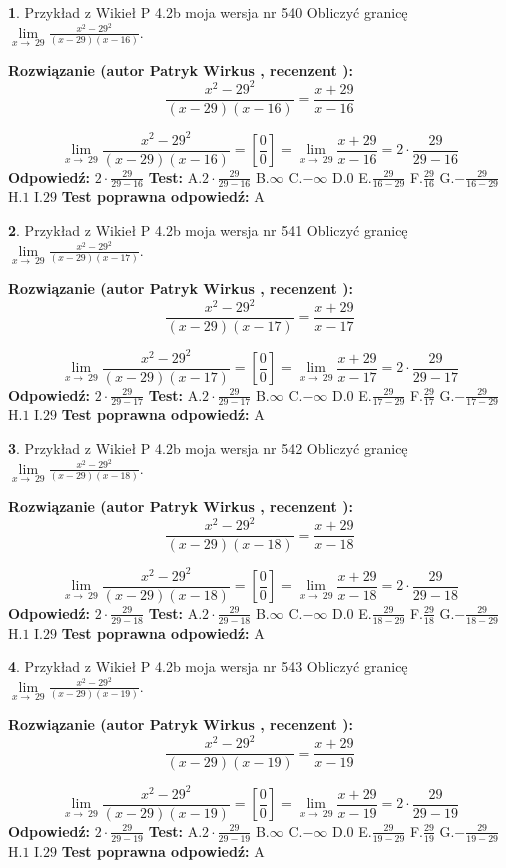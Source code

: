 \documentclass[12pt, a4paper]{article}
\theoremstyle{definition} %
\newtheorem{zad}{}
\newcommand{\zadStart}[1]{\begin{zad}#1\newline}
\newcommand{\zadStop}{\end{zad}}
\newcommand{\rozwStart}[2]{\noindent \textbf{Rozwiązanie (autor #1 , recenzent #2): }\newline}
\newcommand{\rozwStop}{\newline}
\newcommand{\odpStart}{\noindent \textbf{Odpowiedź:}\newline}
\newcommand{\odpStop}{\newline}
\newcommand{\testStart}{\noindent \textbf{Test:}\newline}
\newcommand{\testStop}{\newline}
\newcommand{\kluczStart}{\noindent \textbf{Test poprawna odpowiedź:}\newline}
\newcommand{\kluczStop}{\newline}
\begin{document}
\zadStart{Przykład z Wikieł P 4.2b moja wersja nr 540}
Obliczyć granicę $\lim\limits_{x\to\ 29}\frac{x^{2}-29^{2}}{(x-29)(x-16)}$.
\zadStop
\rozwStart{Patryk Wirkus}{}
$$\frac{x^{2}-29^{2}}{(x-29)(x-16)}=\frac{x+29}{x-16}$$

$$\lim\limits_{x\to\ 29}\frac{x^{2}-29^{2}}{(x-29)(x-16)}=[\frac{0}{0}]=\lim\limits_{x\to\ 29}\frac{x+29}{x-16}=2 \cdot \frac{29}{29-16}$$
\rozwStop
\odpStart
$2 \cdot \frac{29}{29-16}$
\odpStop
\testStart
A.$2 \cdot \frac{29}{29-16}$
B.$\infty$
C.$-\infty$
D.$0$
E.$\frac{29}{16-29}$
F.$\frac{29}{16}$
G.$-\frac{29}{16-29}$
H.$1$
I.$29$
\testStop
\kluczStart
A
\kluczStop



\zadStart{Przykład z Wikieł P 4.2b moja wersja nr 541}
Obliczyć granicę $\lim\limits_{x\to\ 29}\frac{x^{2}-29^{2}}{(x-29)(x-17)}$.
\zadStop
\rozwStart{Patryk Wirkus}{}
$$\frac{x^{2}-29^{2}}{(x-29)(x-17)}=\frac{x+29}{x-17}$$

$$\lim\limits_{x\to\ 29}\frac{x^{2}-29^{2}}{(x-29)(x-17)}=[\frac{0}{0}]=\lim\limits_{x\to\ 29}\frac{x+29}{x-17}=2 \cdot \frac{29}{29-17}$$
\rozwStop
\odpStart
$2 \cdot \frac{29}{29-17}$
\odpStop
\testStart
A.$2 \cdot \frac{29}{29-17}$
B.$\infty$
C.$-\infty$
D.$0$
E.$\frac{29}{17-29}$
F.$\frac{29}{17}$
G.$-\frac{29}{17-29}$
H.$1$
I.$29$
\testStop
\kluczStart
A
\kluczStop



\zadStart{Przykład z Wikieł P 4.2b moja wersja nr 542}
Obliczyć granicę $\lim\limits_{x\to\ 29}\frac{x^{2}-29^{2}}{(x-29)(x-18)}$.
\zadStop
\rozwStart{Patryk Wirkus}{}
$$\frac{x^{2}-29^{2}}{(x-29)(x-18)}=\frac{x+29}{x-18}$$

$$\lim\limits_{x\to\ 29}\frac{x^{2}-29^{2}}{(x-29)(x-18)}=[\frac{0}{0}]=\lim\limits_{x\to\ 29}\frac{x+29}{x-18}=2 \cdot \frac{29}{29-18}$$
\rozwStop
\odpStart
$2 \cdot \frac{29}{29-18}$
\odpStop
\testStart
A.$2 \cdot \frac{29}{29-18}$
B.$\infty$
C.$-\infty$
D.$0$
E.$\frac{29}{18-29}$
F.$\frac{29}{18}$
G.$-\frac{29}{18-29}$
H.$1$
I.$29$
\testStop
\kluczStart
A
\kluczStop



\zadStart{Przykład z Wikieł P 4.2b moja wersja nr 543}
Obliczyć granicę $\lim\limits_{x\to\ 29}\frac{x^{2}-29^{2}}{(x-29)(x-19)}$.
\zadStop
\rozwStart{Patryk Wirkus}{}
$$\frac{x^{2}-29^{2}}{(x-29)(x-19)}=\frac{x+29}{x-19}$$

$$\lim\limits_{x\to\ 29}\frac{x^{2}-29^{2}}{(x-29)(x-19)}=[\frac{0}{0}]=\lim\limits_{x\to\ 29}\frac{x+29}{x-19}=2 \cdot \frac{29}{29-19}$$
\rozwStop
\odpStart
$2 \cdot \frac{29}{29-19}$
\odpStop
\testStart
A.$2 \cdot \frac{29}{29-19}$
B.$\infty$
C.$-\infty$
D.$0$
E.$\frac{29}{19-29}$
F.$\frac{29}{19}$
G.$-\frac{29}{19-29}$
H.$1$
I.$29$
\testStop
\kluczStart
A
\kluczStop
\end{document}
